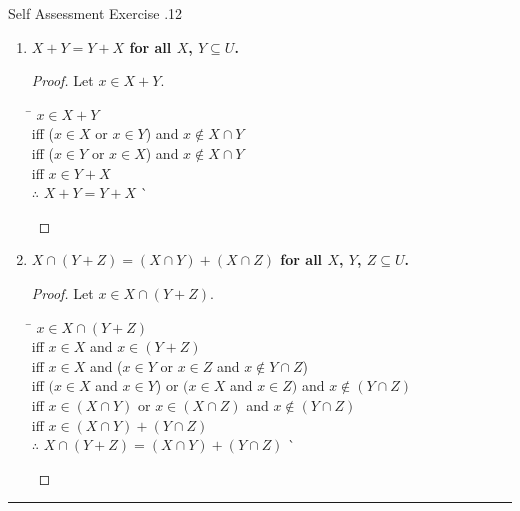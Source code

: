 \documentclass[../notes.tex]{subfiles}
\begin{document}
\begin{exercise}{Self Assessment Exercise \thechapter.12}
\begin{enumerate}
						\begin{enumerate}[label=(\alph*)]
							\item \textbf{$X + Y = Y + X$ for all $X$, $Y \subseteq U$.}
								\begin{proof}
									Let $x \in X + Y$.
									\begin{tabbing}
										\qquad \= $x \in X + Y$\\
										iff \> ($x \in X$ or $x \in Y$) and $x \notin X \cap Y$\\
										iff \> ($x \in Y$ or $x \in X$) and $x \notin X \cap Y$\\
										iff \> $x \in Y + X$\\
										$\therefore$ \> $X + Y = Y + X$ \` \qedhere
									\end{tabbing}
								\end{proof}
							\item \textbf{$X \cap (Y + Z) = (X \cap Y) + (X \cap Z)$ for all $X$, $Y$, $Z \subseteq U$.}
								\begin{proof}
									Let $x \in X \cap (Y + Z)$.
									\begin{tabbing}
										\qquad \= $x \in X \cap (Y + Z)$\\
										iff \> $x \in X$ and $x \in (Y + Z)$\\
										iff \> $x \in X$ and ($x \in Y$ or $x \in Z$ and $x \notin Y \cap Z$)\\
										iff \> $(x \in X$ and $x \in Y$) or $(x \in X$ and $x \in Z)$ and $x \notin (Y \cap Z)$\\
										iff \> $x \in (X \cap Y)$ or $x \in (X \cap Z)$ and $x \notin (Y \cap Z)$\\
										iff \> $x \in (X \cap Y) + (Y \cap Z)$\\
										$\therefore$ \> $X \cap (Y + Z) = (X \cap Y) + (Y \cap Z)$ \` \qedhere
									\end{tabbing}
								\end{proof}
						\end{enumerate}
				\end{enumerate}
			\end{exercise}
				\noindent\rule{\textwidth}{0.4pt}
	
\end{document}
